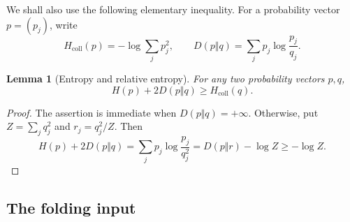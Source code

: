 \documentclass[11pt]{article}
\newtheorem{lemma}[theorem]{Lemma}
\begin{document}
We shall also use the following elementary inequality.  For a
probability vector $p=(p_j)$, write
\[
 H_{\mathrm{coll}}(p)=-\log\sum_jp_j^2,
 \qquad
 D(p\Vert q)=\sum_jp_j\log\frac{p_j}{q_j}.
\]

\begin{lemma}[Entropy and relative entropy]
\label{lem_pham_relative_entropy}
For any two probability vectors $p,q$,
\begin{equation}
 H(p)+2D(p\Vert q)\geq H_{\mathrm{coll}}(q).
 \label{eq_pham_relative_entropy}
\end{equation}
\end{lemma}

\begin{proof}
The assertion is immediate when $D(p\Vert q)=+\infty$.  Otherwise,
put $Z=\sum_jq_j^2$ and $r_j=q_j^2/Z$.  Then
\[
 H(p)+2D(p\Vert q)
 =\sum_jp_j\log\frac{p_j}{q_j^2}
 =D(p\Vert r)-\log Z\geq-\log Z.
\]
\end{proof}

\subsection{The folding input}
\end{document}
